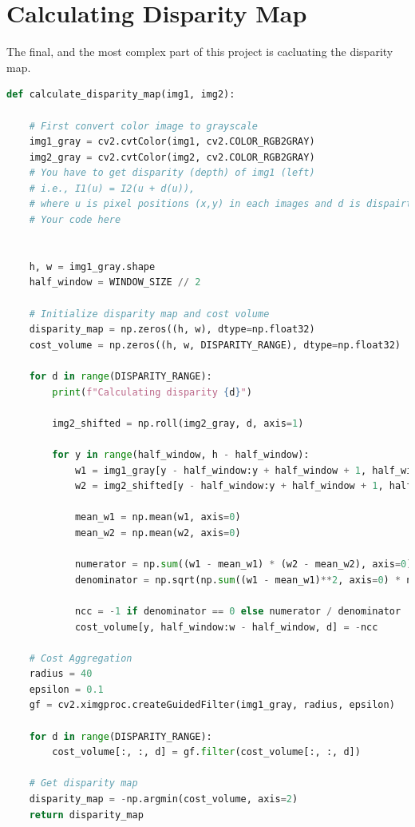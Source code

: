 \section*{Calculating Disparity Map}
The final, and the most complex part of this project is cacluating the disparity map.
\begin{lstlisting}[language=python]
def calculate_disparity_map(img1, img2):
    
    # First convert color image to grayscale
    img1_gray = cv2.cvtColor(img1, cv2.COLOR_RGB2GRAY)
    img2_gray = cv2.cvtColor(img2, cv2.COLOR_RGB2GRAY)
    # You have to get disparity (depth) of img1 (left)
    # i.e., I1(u) = I2(u + d(u)),
    # where u is pixel positions (x,y) in each images and d is dispairty map.
    # Your code here
    
    
    h, w = img1_gray.shape
    half_window = WINDOW_SIZE // 2
    
    # Initialize disparity map and cost volume
    disparity_map = np.zeros((h, w), dtype=np.float32)
    cost_volume = np.zeros((h, w, DISPARITY_RANGE), dtype=np.float32)  

    for d in range(DISPARITY_RANGE):
        print(f"Calculating disparity {d}")

        img2_shifted = np.roll(img2_gray, d, axis=1)

        for y in range(half_window, h - half_window):
            w1 = img1_gray[y - half_window:y + half_window + 1, half_window:w - half_window]
            w2 = img2_shifted[y - half_window:y + half_window + 1, half_window:w - half_window]
            
            mean_w1 = np.mean(w1, axis=0)
            mean_w2 = np.mean(w2, axis=0)
            
            numerator = np.sum((w1 - mean_w1) * (w2 - mean_w2), axis=0)
            denominator = np.sqrt(np.sum((w1 - mean_w1)**2, axis=0) * np.sum((w2 - mean_w2)**2, axis=0))

            ncc = -1 if denominator == 0 else numerator / denominator
            cost_volume[y, half_window:w - half_window, d] = -ncc

    # Cost Aggregation
    radius = 40
    epsilon = 0.1 
    gf = cv2.ximgproc.createGuidedFilter(img1_gray, radius, epsilon)

    for d in range(DISPARITY_RANGE):
        cost_volume[:, :, d] = gf.filter(cost_volume[:, :, d])
    
    # Get disparity map
    disparity_map = -np.argmin(cost_volume, axis=2)
    return disparity_map
\end{lstlisting}

